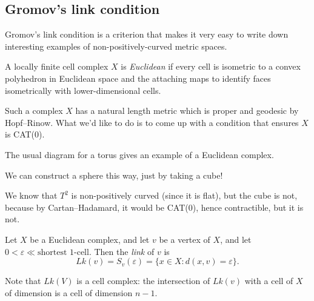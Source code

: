 \documentclass[a4paper]{article}
\begin{document}
\subsection{Gromov's link condition}
Gromov's link condition is a criterion that makes it very easy to write down interesting examples of non-positively-curved metric spaces.

\begin{defi}
  A locally finite cell complex $X$ is \emph{Euclidean} if every cell is isometric to a convex polyhedron in Euclidean space and the attaching maps to identify faces isometrically with lower-dimensional cells.
\end{defi}
Such a complex $X$ has a natural length metric which is proper and geodesic by Hopf--Rinow. What we'd like to do is to come up with a condition that ensures $X$ is CAT(0).

\begin{eg}
  The usual diagram for a torus gives an example of a Euclidean complex.
  \begin{center}
  \end{center}
\end{eg}

\begin{eg}
  We can construct a sphere this way, just by taking a cube!
\end{eg}
We know that $T^2$ is non-positively curved (since it is flat), but the cube is not, because by Cartan--Hadamard, it would be CAT(0), hence contractible, but it is not.

\begin{defi}[Link]
  Let $X$ be a Euclidean complex, and let $v$ be a vertex of $X$, and let $0 < \varepsilon \ll \text{shortest $1$-cell}$. Then the \emph{link} of $v$ is
  \[
    Lk(v) = S_v(\varepsilon) = \{x \in X: d(x, v) = \varepsilon\}.
  \]
\end{defi}
Note that $Lk(V)$ is a cell complex: the intersection of $Lk(v)$ with a cell of $X$ of dimension is a cell of dimension $n - 1$.
\end{document}
